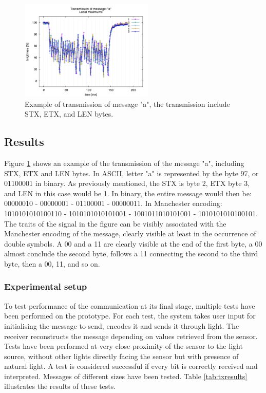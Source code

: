 \begin{figure}
\centering
\includegraphics[height=180px]{img/transmission}
\caption{Example of transmission of message "a", the transmission include STX, ETX, and LEN bytes.}
\label{fig:transmissionA}
\end{figure}

\subsection{Results}

Figure \ref{fig:transmissionA} shows an example of the transmission of the message "a", including STX, ETX and LEN bytes.
In ASCII, letter "a" is represented by the byte 97, or 01100001 in binary.
As previously mentioned, the STX is byte 2, ETX byte 3, and LEN in this case would be 1.
In binary, the entire message would then be: 00000010 - 00000001 - 01100001 - 00000011.
In Manchester encoding: 1010101010100110 - 1010101010101001 - 1001011010101001 - 1010101010100101.
The traits of the signal in the figure can be visibly associated with the Manchester encoding of the message, clearly visible at least in the occurrence of double symbols. 
A 00 and a 11 are clearly visible at the end of the first byte, a 00 almost conclude the second byte, follows a 11 connecting the second to the third byte, then a 00, 11, and so on.

\subsubsection{Experimental setup}
To test performance of the communication at its final stage, multiple tests have been performed on the prototype.
For each test, the system takes user input for initialising the message to send, encodes it and sends it through light. 
The receiver reconstructs the message depending on values retrieved from the sensor.
Tests have been performed at very close proximity of the sensor to the light source, without other lights directly facing the sensor but with presence of natural light.
A test is considered successful if every bit is correctly received and interpreted.
Messages of different sizes have been tested.
Table \ref{tab:txresults} illustrates the results of these tests.

